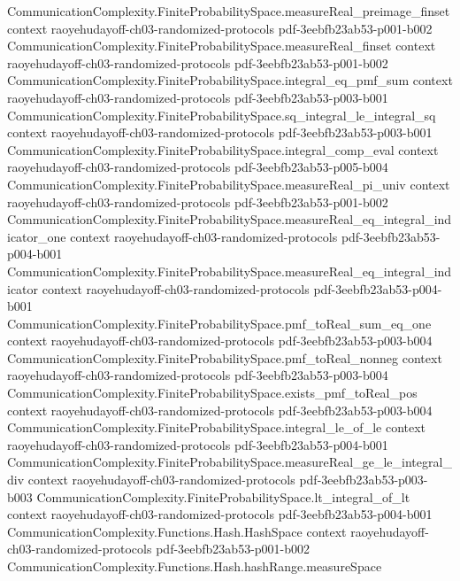 \begin{theorem}
\proofstep
  {CommunicationComplexity.FiniteProbabilitySpace.measureReal_preimage_finset}
  {context}
  {raoyehudayoff-ch03-randomized-protocols}
  {pdf-3eebfb23ab53-p001-b002}
\proofstep
  {CommunicationComplexity.FiniteProbabilitySpace.measureReal_finset}
  {context}
  {raoyehudayoff-ch03-randomized-protocols}
  {pdf-3eebfb23ab53-p001-b002}
\proofstep
  {CommunicationComplexity.FiniteProbabilitySpace.integral_eq_pmf_sum}
  {context}
  {raoyehudayoff-ch03-randomized-protocols}
  {pdf-3eebfb23ab53-p003-b001}
\proofstep
  {CommunicationComplexity.FiniteProbabilitySpace.sq_integral_le_integral_sq}
  {context}
  {raoyehudayoff-ch03-randomized-protocols}
  {pdf-3eebfb23ab53-p003-b001}
\proofstep
  {CommunicationComplexity.FiniteProbabilitySpace.integral_comp_eval}
  {context}
  {raoyehudayoff-ch03-randomized-protocols}
  {pdf-3eebfb23ab53-p005-b004}
\proofstep
  {CommunicationComplexity.FiniteProbabilitySpace.measureReal_pi_univ}
  {context}
  {raoyehudayoff-ch03-randomized-protocols}
  {pdf-3eebfb23ab53-p001-b002}
\proofstep
  {CommunicationComplexity.FiniteProbabilitySpace.measureReal_eq_integral_indicator_one}
  {context}
  {raoyehudayoff-ch03-randomized-protocols}
  {pdf-3eebfb23ab53-p004-b001}
\proofstep
  {CommunicationComplexity.FiniteProbabilitySpace.measureReal_eq_integral_indicator}
  {context}
  {raoyehudayoff-ch03-randomized-protocols}
  {pdf-3eebfb23ab53-p004-b001}
\proofstep
  {CommunicationComplexity.FiniteProbabilitySpace.pmf_toReal_sum_eq_one}
  {context}
  {raoyehudayoff-ch03-randomized-protocols}
  {pdf-3eebfb23ab53-p003-b004}
\proofstep
  {CommunicationComplexity.FiniteProbabilitySpace.pmf_toReal_nonneg}
  {context}
  {raoyehudayoff-ch03-randomized-protocols}
  {pdf-3eebfb23ab53-p003-b004}
\proofstep
  {CommunicationComplexity.FiniteProbabilitySpace.exists_pmf_toReal_pos}
  {context}
  {raoyehudayoff-ch03-randomized-protocols}
  {pdf-3eebfb23ab53-p003-b004}
\proofstep
  {CommunicationComplexity.FiniteProbabilitySpace.integral_le_of_le}
  {context}
  {raoyehudayoff-ch03-randomized-protocols}
  {pdf-3eebfb23ab53-p004-b001}
\proofstep
  {CommunicationComplexity.FiniteProbabilitySpace.measureReal_ge_le_integral_div}
  {context}
  {raoyehudayoff-ch03-randomized-protocols}
  {pdf-3eebfb23ab53-p003-b003}
\proofstep
  {CommunicationComplexity.FiniteProbabilitySpace.lt_integral_of_lt}
  {context}
  {raoyehudayoff-ch03-randomized-protocols}
  {pdf-3eebfb23ab53-p004-b001}
\proofstep
  {CommunicationComplexity.Functions.Hash.HashSpace}
  {context}
  {raoyehudayoff-ch03-randomized-protocols}
  {pdf-3eebfb23ab53-p001-b002}
\proofstep
  {CommunicationComplexity.Functions.Hash.hashRange.measureSpace}

\end{theorem}
